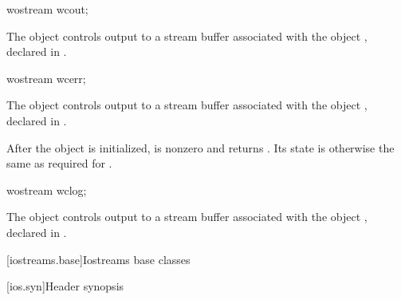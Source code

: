 %
\begin{itemdecl}
wostream wcout;
\end{itemdecl}

\begin{itemdescr}
\pnum
The object
controls output to a stream buffer
associated with the object
,
declared in
%
.
\end{itemdescr}

%
\begin{itemdecl}
wostream wcerr;
\end{itemdecl}

\begin{itemdescr}
\pnum
The object
controls output to a stream buffer
associated with the object
,
declared in
%
.

\pnum
After the object
is initialized,
is nonzero and  returns .
Its state is otherwise the same as required for
.
\end{itemdescr}

%
\begin{itemdecl}
wostream wclog;
\end{itemdecl}

\begin{itemdescr}
\pnum
The object
controls output to a stream buffer
associated with the object
,
declared in
%
.
\end{itemdescr}

[iostreams.base]{Iostreams base classes}

[ios.syn]{Header  synopsis}
%
%

